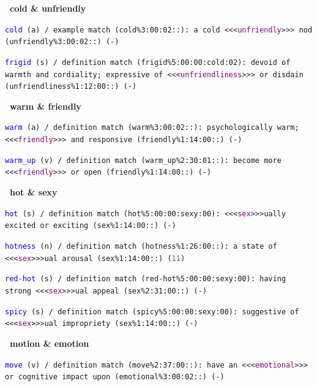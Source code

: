 \documentclass[12pt,a4paper]{article}
\begin{document}
{\vspace{1em}

\noindent\textbf{\textbullet\ cold \& unfriendly}

\texttt{\textcolor{blue}{cold} (a) / example match (cold\%3:00:02::): a cold <<<\textcolor{purple}{unfriendly}>>> nod (unfriendly\%3:00:02::) (-)}

\texttt{\textcolor{blue}{frigid} (s) / definition match (frigid\%5:00:00:cold:02): devoid of warmth and cordiality; expressive of <<<\textcolor{purple}{unfriendliness}>>> or disdain (unfriendliness\%1:12:00::) (-)}

\vspace{1em}

\noindent\textbf{\textbullet\ warm \& friendly}

\texttt{\textcolor{blue}{warm} (a) / definition match (warm\%3:00:02::): psychologically warm; <<<\textcolor{purple}{friendly}>>> and responsive (friendly\%1:14:00::) (-)}

\texttt{\textcolor{blue}{warm\_up} (v) / definition match (warm\_up\%2:30:01::): become more <<<\textcolor{purple}{friendly}>>> or open (friendly\%1:14:00::) (-)}

\vspace{1em}

\noindent\textbf{\textbullet\ hot \& sexy}

\texttt{\textcolor{blue}{hot} (s) / definition match (hot\%5:00:00:sexy:00): <<<\textcolor{purple}{sex}>>>ually excited or exciting (sex\%1:14:00::) (-)}

\texttt{\textcolor{blue}{hotness} (n) / definition match (hotness\%1:26:00::): a state of <<<\textcolor{purple}{sex}>>>ual arousal (sex\%1:14:00::) (\textcolor{ForestGreen}{11})}

\texttt{\textcolor{blue}{red-hot} (s) / definition match (red-hot\%5:00:00:sexy:00): having strong <<<\textcolor{purple}{sex}>>>ual appeal (sex\%2:31:00::) (-)}

\texttt{\textcolor{blue}{spicy} (s) / definition match (spicy\%5:00:00:sexy:00): suggestive of <<<\textcolor{purple}{sex}>>>ual impropriety (sex\%1:14:00::) (-)}

\vspace{1em}

\noindent\textbf{\textbullet\ motion \& emotion}

\texttt{\textcolor{blue}{move} (v) / definition match (move\%2:37:00::): have an <<<\textcolor{purple}{emotional}>>> or cognitive impact upon (emotional\%3:00:02::) (-)}

}
\end{document}
